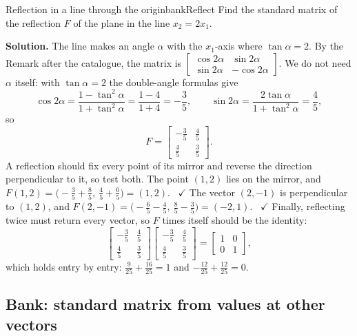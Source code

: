 \documentclass[11pt]{article}
\begin{document}
\begin{exmp}{Reflection in a line through the origin}{bankReflect}
Find the standard matrix of the reflection $F$ of the plane in the line $x_2=2x_1$.

\textbf{Solution.} The line makes an angle $\alpha$ with the $x_1$-axis where $\tan\alpha=2$. By the Remark after the catalogue, the matrix is $\begin{bmatrix}\cos2\alpha&\sin2\alpha\\\sin2\alpha&-\cos2\alpha\end{bmatrix}$. We do not need $\alpha$ itself: with $\tan\alpha=2$ the double-angle formulas give
\[
\cos2\alpha=\frac{1-\tan^2\alpha}{1+\tan^2\alpha}=\frac{1-4}{1+4}=-\frac35,\qquad \sin2\alpha=\frac{2\tan\alpha}{1+\tan^2\alpha}=\frac45,
\]
so
\[
F=\begin{bmatrix}-\tfrac35&\tfrac45\\\tfrac45&\tfrac35\end{bmatrix}.
\]
A reflection should fix every point of its mirror and reverse the direction perpendicular to it, so test both. The point $(1,2)$ lies on the mirror, and $F(1,2)=\bigl(-\tfrac35+\tfrac85,\ \tfrac45+\tfrac65\bigr)=(1,2)$. \ $\checkmark$ The vector $(2,-1)$ is perpendicular to $(1,2)$, and $F(2,-1)=\bigl(-\tfrac65-\tfrac45,\ \tfrac85-\tfrac35\bigr)=(-2,1)$. \ $\checkmark$ Finally, reflecting twice must return every vector, so $F$ times itself should be the identity:
\[
\begin{bmatrix}-\tfrac35&\tfrac45\\\tfrac45&\tfrac35\end{bmatrix}\begin{bmatrix}-\tfrac35&\tfrac45\\\tfrac45&\tfrac35\end{bmatrix}=\begin{bmatrix}1&0\\0&1\end{bmatrix},
\]
which holds entry by entry: $\tfrac{9}{25}+\tfrac{16}{25}=1$ and $-\tfrac{12}{25}+\tfrac{12}{25}=0$.
\end{exmp}

\subsection*{Bank: standard matrix from values at other vectors}
\end{document}
